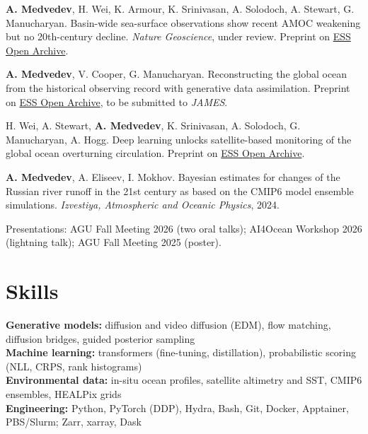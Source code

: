 \documentclass[letterpaper,10pt]{article}
\begin{document}
{\small
\textbf{A. Medvedev}, H. Wei, K. Armour, K. Srinivasan, A. Solodoch, A. Stewart, G. Manucharyan. Basin-wide sea-surface observations show recent AMOC weakening but no 20th-century decline. \textit{Nature Geoscience}, under review. Preprint on \href{https://doi.org/10.22541/essoar.15002298/v1}{ESS Open Archive}.

\textbf{A. Medvedev}, V. Cooper, G. Manucharyan. Reconstructing the global ocean from the historical observing record with generative data assimilation. Preprint on \href{https://doi.org/10.22541/essoar.15011822/v1}{ESS Open Archive}, to be submitted to \textit{JAMES}.

H. Wei, A. Stewart, \textbf{A. Medvedev}, K. Srinivasan, A. Solodoch, G. Manucharyan, A. Hogg. Deep learning unlocks satellite-based monitoring of the global ocean overturning circulation. Preprint on \href{https://essopenarchive.org/doi/abs/10.22541/essoar.15004679}{ESS Open Archive}.

\textbf{A. Medvedev}, A. Eliseev, I. Mokhov. Bayesian estimates for changes of the Russian river runoff in the 21st century as based on the CMIP6 model ensemble simulations. \textit{Izvestiya, Atmospheric and Oceanic Physics}, 2024.

Presentations: AGU Fall Meeting 2026 (two oral talks); AI4Ocean Workshop 2026 (lightning talk); AGU Fall Meeting 2025 (poster).\par}

\section{Skills}

\textbf{Generative models:} diffusion and video diffusion (EDM), flow matching, diffusion bridges, guided posterior sampling\\
\textbf{Machine learning:} transformers (fine-tuning, distillation), probabilistic scoring (NLL, CRPS, rank histograms)\\
\textbf{Environmental data:} in-situ ocean profiles, satellite altimetry and SST, CMIP6 ensembles, HEALPix grids\\
\textbf{Engineering:} Python, PyTorch (DDP), Hydra, Bash, Git, Docker, Apptainer, PBS/Slurm; Zarr, xarray, Dask
\end{document}
